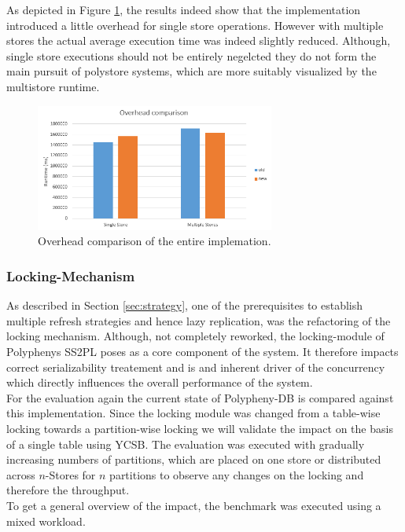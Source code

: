 As depicted in Figure \ref{fig:overhead}, the results indeed show that the implementation introduced a little overhead for single store operations.
However with multiple stores the actual average execution time was indeed slightly reduced. Although, single store executions should not be entirely negelcted
they do not form the main pursuit of polystore systems, which are more suitably visualized by the multistore runtime.


\begin{figure}[t] 
    \centering 
    \includegraphics[width=0.7\textwidth]{Figures/overhead.png}
    \caption{Overhead comparison of the entire implemation.}
    \label{fig:overhead}
\end{figure}


\subsubsection{Locking-Mechanism} 

As described in Section \ref{sec:strategy}, one of the prerequisites to establish multiple refresh strategies and hence lazy replication,  
was the refactoring of the locking mechanism. Although, not completely reworked, the locking-module of Polyphenys SS2PL 
poses as a core component of the system. It therefore  impacts correct serializability treatement and is and inherent driver of 
the concurrency which directly influences the overall performance of the system.\\
For the evaluation again the current state of Polypheny-DB is compared against this implementation.
Since the locking module was changed from a table-wise locking towards a partition-wise locking we will validate the impact on the basis of 
a single table using YCSB. 
The evaluation was executed with gradually increasing numbers of partitions, which are placed on one store or distributed across $n$-Stores 
for $n$ partitions to observe any changes on the locking and therefore the throughput.\\
To get a general overview of the impact, the benchmark was executed using a mixed workload.\\

